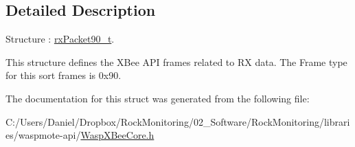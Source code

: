 \subsection{Detailed Description}
Structure \+: \hyperlink{structrx_packet90__t}{rx\+Packet90\+\_\+t}. 

This structure defines the X\+Bee A\+PI frames related to RX data. The Frame type for this sort frames is 0x90. 

The documentation for this struct was generated from the following file\+:\begin{DoxyCompactItemize}
\item 
C\+:/\+Users/\+Daniel/\+Dropbox/\+Rock\+Monitoring/02\+\_\+\+Software/\+Rock\+Monitoring/libraries/waspmote-\/api/\hyperlink{_wasp_x_bee_core_8h}{Wasp\+X\+Bee\+Core.\+h}\end{DoxyCompactItemize}

